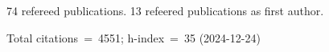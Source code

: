 74 refereed publications. 13 refeered publications as first author.

Total citations~=~4551; h-index~=~35 (2024-12-24)
